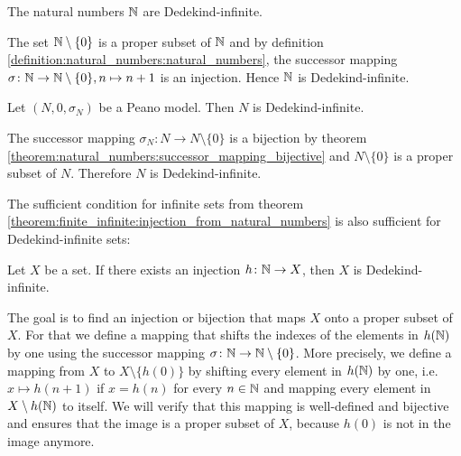 \begin{examples}
    \begin{exampleenumerate}
        \item The natural numbers $\mathbb{N}$ are Dedekind-infinite.
        \begin{miniproof}
            The set $\mathbb{N}\setminus\{0\}$ is a proper subset of $\mathbb{N}$ and by definition \ref{definition:natural_numbers:natural_numbers}, the successor mapping $\sigma\colon\mathbb{N}\to\mathbb{N}\setminus\{0\}, n\mapsto n+1$ is an injection. Hence $\mathbb{N}$ is Dedekind-infinite.
        \end{miniproof}
        \item Let $(N,0,\sigma_N)$ be a Peano model. Then $N$ is Dedekind-infinite.
        \begin{miniproof}
            The successor mapping $\sigma_N\colon N\to N\setminus\{0\}$ is a bijection by theorem \ref{theorem:natural_numbers:successor_mapping_bijective} and $N\setminus\{0\}$ is a proper subset of $N$. Therefore $N$ is Dedekind-infinite.
        \end{miniproof}
    \end{exampleenumerate}
\end{examples}

The sufficient condition for infinite sets from theorem \ref{theorem:finite_infinite:injection_from_natural_numbers} is also sufficient for Dedekind-infinite sets:

\begin{theorem}\label{theorem:finite_infinite:dedekind_infinite_setn_injection}
    Let $X$ be a set. If there exists an injection $h\colon \mathbb{N}\rightarrow X$, then $X$ is Dedekind-infinite.
\end{theorem}

\begin{proofsketch}
    The goal is to find an injection or bijection that maps $X$ onto a proper subset of $X$. For that we define a mapping that shifts the indexes of the elements in $h(\mathbb{N})$ by one using the successor mapping $\sigma\colon\mathbb{N}\to\mathbb{N}\setminus\{0\}$. More precisely, we define a mapping from $X$ to $X\setminus\{h(0)\}$ by shifting every element in $h(\mathbb{N})$ by one, i.e. $x\mapsto h(n+1)$ if $x=h(n)$ for every $n\in\mathbb{N}$ and mapping every element in $X\setminus h(\mathbb{N})$ to itself. We will verify that this mapping is well-defined and bijective and ensures that the image is a proper subset of $X$, because $h(0)$ is not in the image anymore.
\end{proofsketch}

